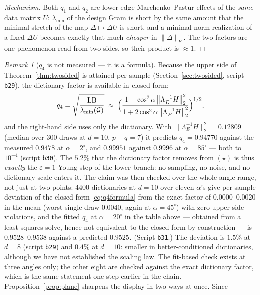 \documentclass[11pt]{article}
\theoremstyle{remark}
\newtheorem{remark}{Remark}[section]
\newcommand{\Gr}{\mathcal{G}}
\newcommand{\Le}{\Lambda_E}
\newcommand{\Cnorm}{\bigl\|\Le^{-1}H\bigr\|_2^2}
\begin{document}
\begin{proof}[Mechanism]
Both $q_1$ and $q_2$ are lower-edge Marchenko--Pastur effects of the \emph{same} data
matrix $U$: $\lambda_{\min}$ of the design Gram is short by the same amount that the
minimal stretch of the map $\Delta\mapsto\Delta U$ is short, and a minimal-norm
realization of a fixed $\Delta U$ becomes exactly that much \emph{cheaper} in
$\|\Delta\|_F$. The two factors are one phenomenon read from two sides, so their product
is $\approx1$.
\end{proof}

\begin{remark}[$q_4$ is not measured --- it is a formula]\label{rem:q4analytic}
Because the upper side of Theorem~\ref{thm:twosided} is attained per sample
(Section~\ref{sec:twosided}, script \texttt{b29}), the dictionary factor is available in
closed form:
\begin{equation}\label{eq:q4formula}
  q_4=\sqrt{\frac{\mathrm{LB}}{\lambda_{\min}(\Gr)}}
  \;\approx\;\Bigl(\frac{1+\cos^2\alpha\,\Cnorm}{1+2\cos^2\alpha\,\Cnorm}\Bigr)^{1/2},
\end{equation}
and the right-hand side uses only the dictionary. With
$\Cnorm=0.12809$ (median over $300$ draws at $d=10$, $p+q=7$) it predicts
$q_4=0.94770$ against the measured $0.9478$ at $\alpha=2^\circ$, and
$0.99951$ against $0.9996$ at $\alpha=85^\circ$ --- both to $10^{-4}$
(script \texttt{b30}). The $5.2\%$ that the dictionary factor removes from $(\star)$
is thus \emph{exactly} the $\varepsilon=1$ Young step of the lower branch: no sampling,
no noise, and no dictionary scale enters it.
The claim was then checked over the whole angle range, not just at two points: $4400$
dictionaries at $d=10$ over eleven $\alpha$'s give per-sample deviation of
the closed form \eqref{eq:q4formula} from the exact factor of $0.0000$--$0.0020$ in the
mean (worst
single draw $0.0040$, again at $\alpha=45^\circ$) with zero upper-side violations, and
the fitted $q_4$ at $\alpha=20^\circ$ in the table above --- obtained from a
least-squares solve, hence not equivalent to the closed form by construction --- is
$0.9528$--$0.9538$ against a predicted $0.9525$. (Script \texttt{b31}.)
The deviation is $1.5\%$ at $d=8$ (script \texttt{b29}) and $0.4\%$ at $d=10$: smaller in
better-conditioned dictionaries, although we have not established the scaling law.
The fit-based check exists at three angles only; the other eight are checked against the
exact dictionary factor, which is the same statement one step earlier in the chain.
Proposition~\ref{prop:plane} sharpens the display in two ways at once. Since

\end{remark}
\end{document}
